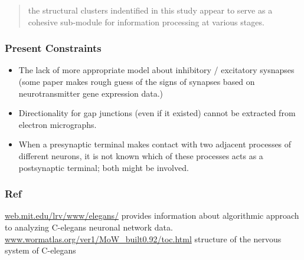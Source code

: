 \begin{quote}{the structural clusters indentified in
this study appear to serve as a cohesive sub-module for
information processing at various stages.}
\end{quote}

\subsubsection{Present Constraints}
\begin{itemize}
  \item The lack of more appropriate model about inhibitory / excitatory sysnapses (some paper makes rough guess of the signs of synapses based on neurotransmitter gene
expression data.)
  \item Directionality for gap junctions (even if it existed) cannot be extracted from electron micrographs.
  \item When a presynaptic terminal makes contact with two adjacent processes of different neurons, it is not known which of these processes acts as a postsynaptic
terminal; both might be involved.
\end{itemize}

\subsubsection{Ref}
\url{web.mit.edu/lrv/www/elegans/}  provides information about algorithmic approach to analyzing C-elegans neuronal network data.
\url{www.wormatlas.org/ver1/MoW_built0.92/toc.html}  structure of the nervous system of C-elegans





\newpage




